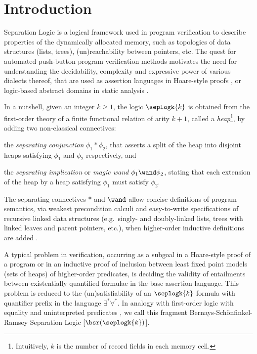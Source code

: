 \section{Introduction}

Separation Logic \cite{IshtiaqOHearn01,Reynolds02} is a logical
framework used in program verification to describe properties of the
dynamically allocated memory, such as topologies of data structures
(lists, trees), (un)reachability between pointers, etc. The quest for
automated push-button program verification methods motivates the need
for understanding the decidability, complexity and expressive power of
various dialects thereof, that are used as assertion languages in
Hoare-style proofs \cite{IshtiaqOHearn01}, or logic-based abstract
domains in static analysis \cite{Infer}.

In a nutshell, given an integer $k\geq1$, the logic $\seplogk{k}$ is
obtained from the first-order theory of a finite functional relation
of arity $k+1$, called a \emph{heap}\footnote{Intuitively, $k$ is the
  number of record fields in each memory cell.}, by adding two
non-classical connectives:~\begin{inparaenum}[(i)]
\item the \emph{separating conjunction} $\phi_1 * \phi_2$, that
  asserts a split of the heap into disjoint heaps satisfying $\phi_1$
  and $\phi_2$ respectively, and
%
\item the \emph{separating implication} or
\emph{magic wand} $\phi_1 \wand \phi_2$, stating that each extension
of the heap by a heap satisfying $\phi_1$ must satisfy
$\phi_2$. 
\end{inparaenum}
The separating connectives $*$ and $\wand$ allow concise definitions
of program semantics, via weakest precondition calculi
\cite{IshtiaqOHearn01} and easy-to-write specifications of recursive
linked data structures (e.g.\ singly- and doubly-linked lists, trees
with linked leaves and parent pointers, etc.), when higher-order
inductive definitions are added \cite{Reynolds02}.

A typical problem in verification, occurring as a subgoal in a
Hoare-style proof of a program or in an inductive proof of inclusion
between least fixed point models (sets of heaps) of higher-order
predicates, is deciding the validity of entailments between
existentially quantified formulae in the base assertion language. This
problem is reduced to the (un)satisfiability of an $\seplogk{k}$
formula with quantifier prefix in the language
$\exists^*\forall^*$. In analogy with first-order logic with equality
and uninterpreted predicates \cite{Ramsey87}, we call this fragment
Bernays-Sch\"onfinkel-Ramsey Separation Logic [$\bsr(\seplogk{k})$].

